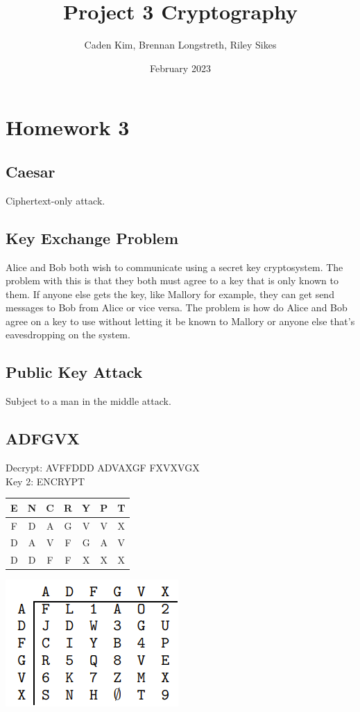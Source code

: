 \documentclass{article}
\title{Project 3 Cryptography}
\author{Caden Kim, Brennan Longstreth, Riley Sikes }
\date{February 2023}
\begin{document}
\maketitle

\section{Homework 3}

\subsection{Caesar}

Ciphertext-only attack.

\subsection{Key Exchange Problem}

Alice and Bob both wish to communicate using a secret key cryptosystem. The problem with this is that they both must agree to a key that is only known to them. If anyone else gets the key, like Mallory for example, they can get send messages to Bob from Alice or vice versa. The problem is how do Alice and Bob agree on a key to use without letting it be known to Mallory or anyone else that's eavesdropping on the system.

\subsection{Public Key Attack}

Subject to a man in the middle attack.

\subsection{ADFGVX}
Decrypt: AVFFDDD ADVAXGF FXVXVGX \\

Key 2: ENCRYPT \\
\begin{center}
\begin{tabular}{ c c c c c c c }
    E & N & C & R & Y & P & T \\ [0.5ex] 
    \hline
    F & D & A & G & V & V & X \\
    D & A & V & F & G & A & V \\
    D & D & F & F & X & X & X \\
\end{tabular}
\end{center}
\includegraphics{Cipher}\\
\end{document}
